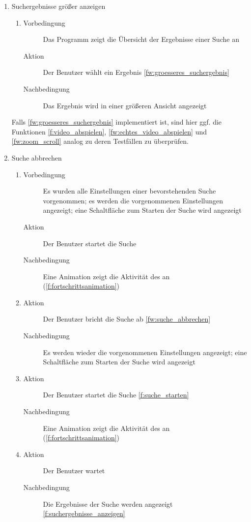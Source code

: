 \begin{enumerate} [label=\bfseries /TSW \arabic*0/, leftmargin=*]
	\item Suchergebnisse größer anzeigen \label{ts:groesseres_suchergebnis}
	\begin{enumerate}[leftmargin=0pt]
		\item
		\begin{description}
			\item[Vorbedingung] Das Programm zeigt die Übersicht der Ergebnisse einer Suche an
			\item[Aktion] Der Benutzer wählt ein Ergebnis \ref{fw:groesseres_suchergebnis}
			\item[Nachbedingung] Das Ergebnis wird in einer größeren Ansicht angezeigt
		\end{description}
	\end{enumerate}
	Falls \ref{fw:groesseres_suchergebnis} implementiert ist, sind hier ggf. die Funktionen \ref{f:video_abspielen}, \ref{fw:echtes_video_abspielen} und \ref{fw:zoom_scroll} analog zu deren Testfällen zu überprüfen.

	\item Suche abbrechen \label{ts:suche_abbrechen}
	\begin{enumerate}[leftmargin=0pt]
		\item
		\begin{description}
			\item[Vorbedingung] Es wurden alle Einstellungen einer bevorstehenden Suche vorgenommen; es werden die vorgenommenen Einstellungen angezeigt; eine Schaltfläche zum Starten der Suche wird angezeigt
			\item[Aktion] Der Benutzer startet die Suche
			\item[Nachbedingung] Eine Animation zeigt die Aktivität des  an (\ref{f:fortschrittsanimation})
		\end{description}
		\item
		\begin{description}
			\item[Aktion] Der Benutzer bricht die Suche ab \ref{fw:suche_abbrechen}
			\item[Nachbedingung] Es werden wieder die vorgenommenen Einstellungen angezeigt; eine Schaltfläche zum Starten der Suche wird angezeigt
		\end{description}
		\item
		\begin{description}
			\item[Aktion] Der Benutzer startet die Suche \ref{f:suche_starten}
			\item[Nachbedingung] Eine Animation zeigt die Aktivität des  an (\ref{f:fortschrittsanimation})
		\end{description}
		\item
		\begin{description}
			\item[Aktion] Der Benutzer wartet \label{test}
			\item[Nachbedingung] Die Ergebnisse der Suche werden angezeigt \ref{f:suchergebnisse_anzeigen}
		\end{description}
	\end{enumerate}


\end{enumerate}
